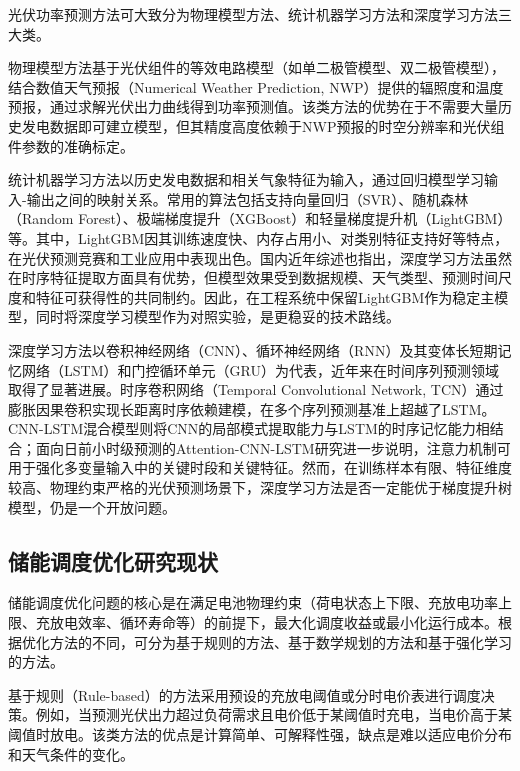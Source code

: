\documentclass[12pt,a4paper]{ctexbook}
\begin{document}
光伏功率预测方法可大致分为物理模型方法、统计机器学习方法和深度学习方法三大类。\cite{pv-physical-model-2019,pv-deep-review-2025}

物理模型方法基于光伏组件的等效电路模型（如单二极管模型、双二极管模型），结合数值天气预报（Numerical Weather Prediction, NWP）提供的辐照度和温度预报，通过求解光伏出力曲线得到功率预测值\cite{pv-physical-model-2019}。该类方法的优势在于不需要大量历史发电数据即可建立模型，但其精度高度依赖于NWP预报的时空分辨率和光伏组件参数的准确标定。

统计机器学习方法以历史发电数据和相关气象特征为输入，通过回归模型学习输入-输出之间的映射关系。常用的算法包括支持向量回归（SVR）、随机森林（Random Forest）、极端梯度提升（XGBoost）和轻量梯度提升机（LightGBM）等\cite{lightgbm-2017}。其中，LightGBM因其训练速度快、内存占用小、对类别特征支持好等特点，在光伏预测竞赛和工业应用中表现出色。国内近年综述也指出，深度学习方法虽然在时序特征提取方面具有优势，但模型效果受到数据规模、天气类型、预测时间尺度和特征可获得性的共同制约\cite{pv-deep-review-2025}。因此，在工程系统中保留LightGBM作为稳定主模型，同时将深度学习模型作为对照实验，是更稳妥的技术路线。\cite{random-forest-2001,xgboost-2016,catboost-2018,lightgbm-2017}

深度学习方法以卷积神经网络（CNN）、循环神经网络（RNN）及其变体长短期记忆网络（LSTM）和门控循环单元（GRU）为代表，近年来在时间序列预测领域取得了显著进展\cite{lstm-pv-2021,tcn-wan-2019}。时序卷积网络（Temporal Convolutional Network, TCN）通过膨胀因果卷积实现长距离时序依赖建模，在多个序列预测基准上超越了LSTM\cite{tcn-wan-2019}。CNN-LSTM混合模型则将CNN的局部模式提取能力与LSTM的时序记忆能力相结合\cite{wang-cnn-lstm-2019}；面向日前小时级预测的Attention-CNN-LSTM研究进一步说明，注意力机制可用于强化多变量输入中的关键时段和关键特征\cite{qu-attention-cnnlstm-2021}。然而，在训练样本有限、特征维度较高、物理约束严格的光伏预测场景下，深度学习方法是否一定能优于梯度提升树模型，仍是一个开放问题。

\subsection{储能调度优化研究现状}

储能调度优化问题的核心是在满足电池物理约束（荷电状态上下限、充放电功率上限、充放电效率、循环寿命等）的前提下，最大化调度收益或最小化运行成本。根据优化方法的不同，可分为基于规则的方法、基于数学规划的方法和基于强化学习的方法。\cite{bess-review-2023,milp-dispatch-2021,drl-energy-storage-2023}

基于规则（Rule-based）的方法采用预设的充放电阈值或分时电价表进行调度决策。例如，当预测光伏出力超过负荷需求且电价低于某阈值时充电，当电价高于某阈值时放电。该类方法的优点是计算简单、可解释性强，缺点是难以适应电价分布和天气条件的变化。\cite{bess-review-2023,milp-dispatch-2021}
\end{document}
